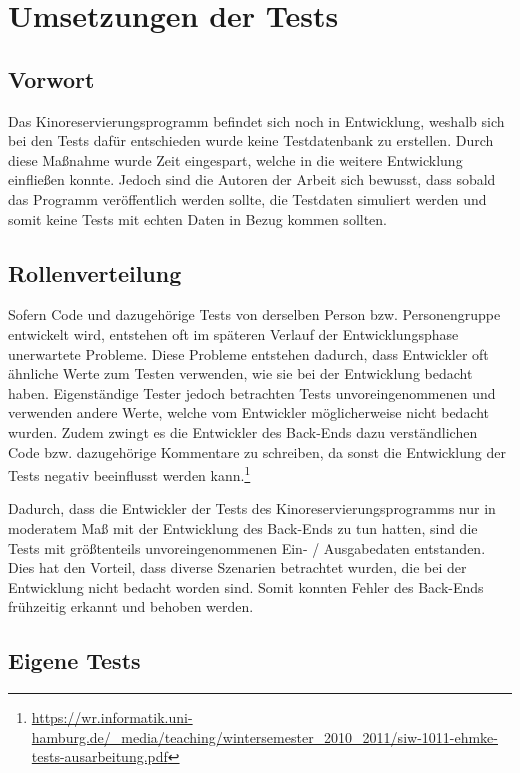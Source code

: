 \section{Umsetzungen der Tests}
\authorsection{\authorRF}

\subsection{Vorwort}

Das Kinoreservierungsprogramm befindet sich noch in Entwicklung, weshalb sich bei den Tests dafür entschieden wurde keine Testdatenbank zu erstellen.
Durch diese Maßnahme wurde Zeit eingespart, welche in die weitere Entwicklung einfließen konnte.
Jedoch sind die Autoren der Arbeit sich bewusst, dass sobald das Programm veröffentlich werden sollte, die Testdaten simuliert werden und somit keine Tests mit echten Daten in Bezug kommen sollten.

\subsection{Rollenverteilung}

Sofern Code und dazugehörige Tests von derselben Person bzw. Personengruppe entwickelt wird, entstehen oft im späteren Verlauf der Entwicklungsphase unerwartete Probleme. Diese Probleme entstehen dadurch, dass Entwickler oft ähnliche Werte zum Testen verwenden, wie sie bei der Entwicklung bedacht haben.
Eigenständige Tester jedoch betrachten Tests unvoreingenommenen und verwenden andere Werte, welche vom Entwickler möglicherweise nicht bedacht wurden.
Zudem zwingt es die Entwickler des Back-Ends dazu verständlichen Code bzw. dazugehörige Kommentare zu schreiben, da sonst die Entwicklung der Tests negativ beeinflusst werden kann.\footnote{\url{https://wr.informatik.uni-hamburg.de/_media/teaching/wintersemester_2010_2011/siw-1011-ehmke-tests-ausarbeitung.pdf}}

Dadurch, dass die Entwickler der Tests des Kinoreservierungsprogramms nur in moderatem Maß mit der Entwicklung des Back-Ends zu tun hatten, sind die Tests mit größtenteils unvoreingenommenen Ein- / Ausgabedaten entstanden.
Dies hat den Vorteil, dass diverse Szenarien betrachtet wurden, die bei der Entwicklung nicht bedacht worden sind.
Somit konnten Fehler des Back-Ends frühzeitig erkannt und behoben werden.


\subsection{Eigene Tests}

